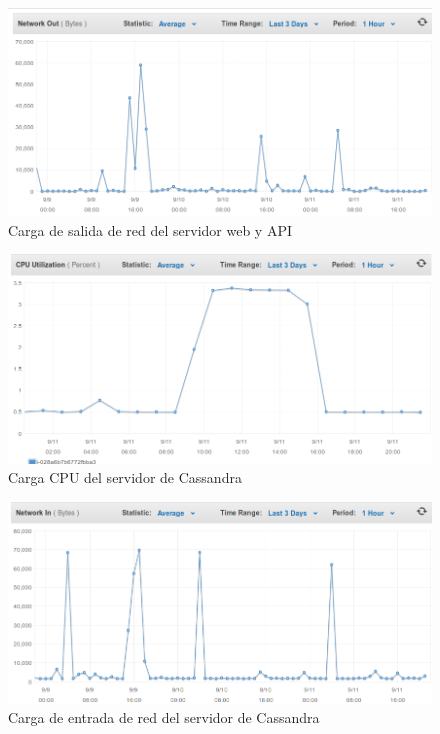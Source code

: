 \begin{figure}[ht]
  \begin{center}
    \includegraphics[scale=0.40]{../images/amazon/netwebou.png}
    \caption{Carga de salida de red del servidor web y API}
    \label{fig:paquetes}
  \end{center}
\end{figure}

\newpage

\begin{figure}[ht]
  \begin{center}
    \includegraphics[scale=0.40]{../images/amazon/cpucassandra.png}
    \caption{Carga CPU del servidor de Cassandra}
    \label{fig:paquetes}
  \end{center}
\end{figure}

\begin{figure}[ht]
  \begin{center}
    \includegraphics[scale=0.40]{../images/amazon/netcassandra.png}
    \caption{Carga de entrada de red del servidor de Cassandra}
    \label{fig:paquetes}
  \end{center}
\end{figure}

